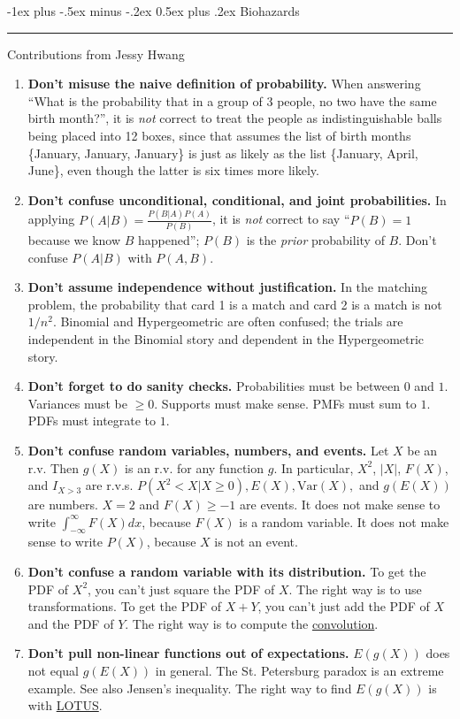 \documentclass[6pt,landscape]{article}
\makeatletter
\newcommand{\var}{\textrm{Var}}
\renewcommand{\section}{\@startsection{section}{1}{0mm}%
                                {-1ex plus -.5ex minus -.2ex}%
                                {0.5ex plus .2ex}%
                                {\normalfont\large\bfseries}}
\makeatother
\begin{document}
\begin{multicols*}{3}
\section{Biohazards} \smallskip \hrule height 2pt \smallskip

Contributions from Jessy Hwang

\begin{enumerate} 
\item \textbf{Don't misuse the naive definition of probability.}   When answering ``What is the probability that in a group of 3 people, no two have the same birth month?'', it is \emph{not} correct to treat the people as indistinguishable balls being placed into 12 boxes, since that assumes the list of birth months \{January, January, January\} is just as likely as the list \{January, April, June\}, even though the latter is six times more likely. \\ 
\item \textbf{Don't confuse unconditional, conditional, and joint probabilities.}  In applying $P(A|B) = \frac{P(B|A)P(A)}{P(B)}$, it is \emph{not} correct to say ``$P(B) = 1$ because we know  $B$ happened''; $P(B)$ is the \emph{prior} probability of $B$. Don't confuse $P(A|B)$ with $P(A,B)$. \\
\item \textbf{Don't assume independence without justification.}  In the matching problem, the probability that card 1 is a match and card 2 is a match is not $1/n^2$.  Binomial and Hypergeometric are often confused; the trials are independent in the Binomial story and dependent in the Hypergeometric story. \\
\item \textbf{Don't forget to do sanity checks.} Probabilities must be between $0$ and $1$. Variances must be $\geq 0$. Supports must make sense. PMFs must sum to $1$. PDFs must integrate to $1$. \\
\item \textbf{Don't confuse random variables, numbers, and events.}  Let $X$ be an r.v. Then $g(X)$ is an r.v. for any function $g$. In particular, $X^2$, $|X|$, $F(X)$, and $I_{X>3}$ are r.v.s. $P(X^2 < X | X \geq 0), E(X), \var(X), $ and $g(E(X))$ are numbers. $X = 2$ and $F(X) \geq -1$ are events. It does not make sense to write $\int_{-\infty}^\infty F(X) dx$, because $F(X)$ is a random variable. It does not make sense to write $P(X)$, because $X$ is not an event. \\
\item \textbf{Don't confuse a random variable with its distribution.}  To get the PDF of $X^2$, you can't just square the PDF of $X$. The right way is to use transformations. To get the PDF of $X + Y$, you can't just add the PDF of $X$ and the PDF of $Y$. The right way is to compute the \hyperref[convolutions]{convolution}.
\item \textbf{Don't pull non-linear functions out of expectations.} $E(g(X))$ does not equal $g(E(X))$ in general. The St. Petersburg paradox is an extreme example.  See also Jensen's inequality. The right way to find $E(g(X))$ is with \hyperref[lotus]{LOTUS}.
\end{enumerate}


\end{multicols*}
\end{document}
